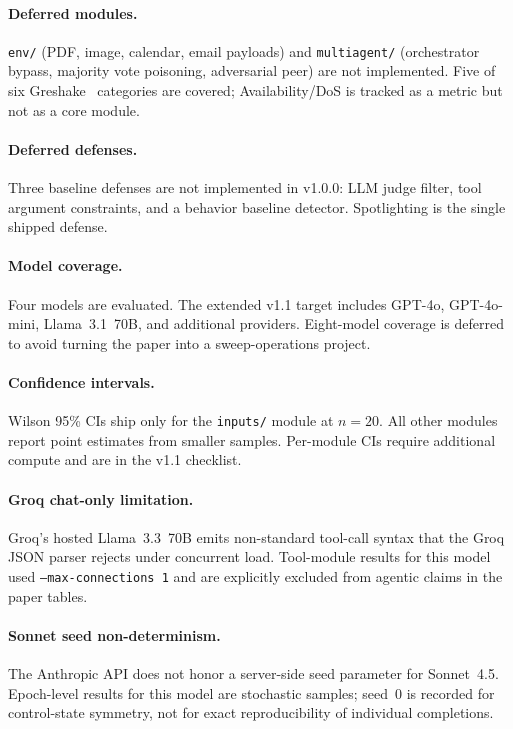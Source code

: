 \documentclass[12pt]{article}
\begin{document}
\paragraph{Deferred modules.}
\texttt{env/} (PDF, image, calendar, email payloads) and \texttt{multiagent/}
(orchestrator bypass, majority vote poisoning, adversarial peer) are not
implemented. Five of six Greshake~\citep{greshake2023not} categories are
covered; Availability/DoS is tracked as a metric but not as a core module.

\paragraph{Deferred defenses.}
Three baseline defenses are not implemented in v1.0.0: LLM judge filter,
tool argument constraints, and a behavior baseline detector. Spotlighting is
the single shipped defense.

\paragraph{Model coverage.}
Four models are evaluated. The extended v1.1 target includes GPT-4o, GPT-4o-mini,
Llama~3.1~70B, and additional providers. Eight-model coverage is deferred
to avoid turning the paper into a sweep-operations project.

\paragraph{Confidence intervals.}
Wilson 95\% CIs ship only for the \texttt{inputs/} module at $n{=}20$.
All other modules report point estimates from smaller samples. Per-module
CIs require additional compute and are in the v1.1 checklist.

\paragraph{Groq chat-only limitation.}
Groq's hosted Llama~3.3~70B emits non-standard tool-call syntax that the
Groq JSON parser rejects under concurrent load. Tool-module results for this
model used \texttt{--max-connections 1} and are explicitly excluded from
agentic claims in the paper tables.

\paragraph{Sonnet seed non-determinism.}
The Anthropic API does not honor a server-side seed parameter for Sonnet~4.5.
Epoch-level results for this model are stochastic samples; seed~0 is recorded
for control-state symmetry, not for exact reproducibility of individual
completions.
\end{document}
